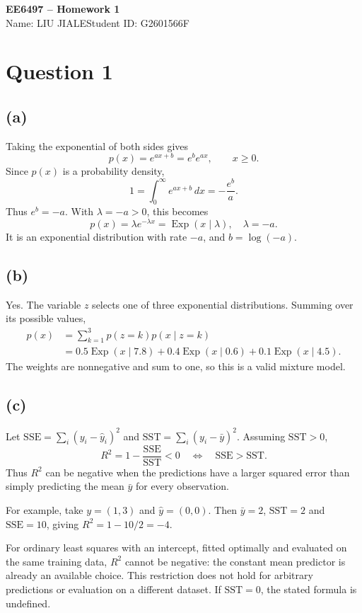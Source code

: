 \documentclass[11pt,a4paper]{article}
\newcommand{\Exp}{\operatorname{Exp}}
\begin{document}
\begin{center}
{\Large\bfseries EE6497 -- Homework 1}\\[10pt]
Name: LIU JIALE\qquad Student ID: G2601566F
\end{center}

\section*{Question 1}
\subsection*{(a)}
Taking the exponential of both sides gives
\[
p(x)=e^{ax+b}=e^b e^{ax},\qquad x\geq 0.
\]
Since $p(x)$ is a probability density,
\[
1=\int_0^\infty e^{ax+b}\,dx=-\frac{e^b}{a}.
\]
Thus $e^b=-a$. With $\lambda=-a>0$, this becomes
\[
\boxed{p(x)=\lambda e^{-\lambda x}=\Exp(x\mid\lambda),\quad\lambda=-a.}
\]
It is an exponential distribution with rate $-a$, and $b=\log(-a)$.

\subsection*{(b)}
Yes. The variable $z$ selects one of three exponential distributions. Summing over its possible values,
\begin{align*}
p(x)&=\sum_{k=1}^3 p(z=k)p(x\mid z=k)\\
&=\boxed{0.5\Exp(x\mid7.8)+0.4\Exp(x\mid0.6)+0.1\Exp(x\mid4.5).}
\end{align*}
The weights are nonnegative and sum to one, so this is a valid mixture model.

\subsection*{(c)}
Let $\mathrm{SSE}=\sum_i(y_i-\hat y_i)^2$ and $\mathrm{SST}=\sum_i(y_i-\bar y)^2$. Assuming $\mathrm{SST}>0$,
\[
R^2=1-\frac{\mathrm{SSE}}{\mathrm{SST}}<0
\quad\Longleftrightarrow\quad
\mathrm{SSE}>\mathrm{SST}.
\]
Thus $R^2$ can be negative when the predictions have a larger squared error than simply predicting the mean $\bar y$ for every observation.

For example, take $y=(1,3)$ and $\hat y=(0,0)$. Then $\bar y=2$, $\mathrm{SST}=2$ and $\mathrm{SSE}=10$, giving $R^2=1-10/2=-4$.

For ordinary least squares with an intercept, fitted optimally and evaluated on the same training data, $R^2$ cannot be negative: the constant mean predictor is already an available choice. This restriction does not hold for arbitrary predictions or evaluation on a different dataset. If $\mathrm{SST}=0$, the stated formula is undefined.
\end{document}

